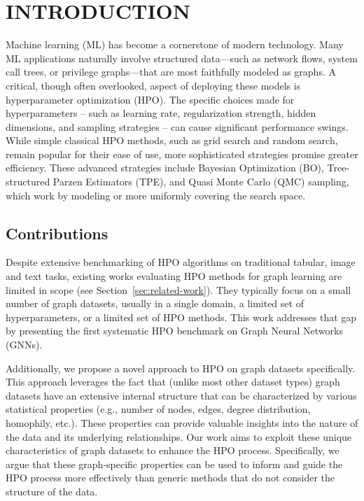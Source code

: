 \section{\uppercase{Introduction}}

Machine learning (ML) has become a cornerstone of modern technology. Many ML applications naturally involve structured data—such as network flows, system call trees, or privilege graphs—that are most faithfully modeled as graphs. A critical, though often overlooked, aspect of deploying these models is hyperparameter optimization (HPO). The specific choices made for hyperparameters -- such as learning rate, regularization strength, hidden dimensions, and sampling strategies -- can cause significant performance swings. While simple classical HPO methods, such as grid search and random search, remain popular for their ease of use, more sophisticated strategies promise greater efficiency. These advanced strategies include Bayesian Optimization (BO), Tree-structured Parzen Estimators (TPE), and Quasi Monte Carlo (QMC) sampling, which work by modeling or more uniformly covering the search space.

\subsection{Contributions}

Despite extensive benchmarking of HPO algorithms on traditional tabular, image and text tasks, existing works evaluating HPO methods for graph learning are limited in scope (see Section~\ref{sec:related-work}). They typically focus on a small number of graph datasets, usually in a single domain, a limited set of hyperparameters, or a limited set of HPO methods. This work addresses that gap by presenting the first systematic HPO benchmark on Graph Neural Networks (GNNs).

Additionally, we propose a novel approach to HPO on graph datasets specifically. This approach leverages the fact that (unlike most other dataset types) graph datasets have an extensive internal structure that can be characterized by various statistical properties (e.g., number of nodes, edges, degree distribution, homophily, etc.). These properties can provide valuable insights into the nature of the data and its underlying relationships. Our work aims to exploit these unique characteristics of graph datasets to enhance the HPO process. Specifically, we argue that these graph-specific properties can be used to inform and guide the HPO process more effectively than generic methods that do not consider the structure of the data.

